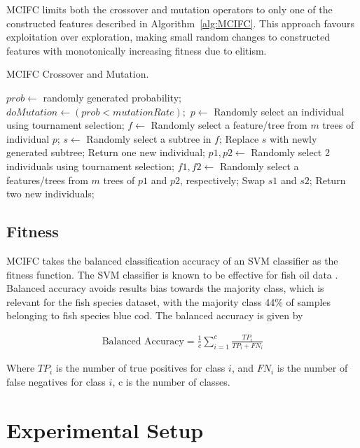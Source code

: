 \documentclass[runningheads]{llncs}
\begin{document}
MCIFC limits both the crossover and mutation operators to only one of the constructed features described in Algorithm~\ref{alg:MCIFC}. 
This approach favours exploitation over exploration, making small random changes to constructed features with monotonically increasing fitness due to elitism. 

\begin{algorithm}
\caption{MCIFC Crossover and Mutation.}
\label{alg:MCIFC}
\begin{algorithmic}
\State $prob \gets $ randomly generated probability;
\State $doMutation \gets (prob < mutationRate);$
  \State $p \gets$ Randomly select an individual using tournament selection; 
  \State $f \gets$ Randomly select a feature/tree from $m$ trees of individual $p$;
  \State $s \gets$ Randomly select a subtree in $f$; 
  \State Replace $s$ with newly generated subtree; 
  \State Return one new individual; 
\Else 
  \State $p1, p2 \gets $ Randomly select 2 individuals using tournament selection; 
  \State $f1, f2 \gets$ Randomly select a features/trees from $m$ trees of  $p1$ and $p2$, respectively;
  \State Swap $s1$ and $s2$; 
  \State Return two new individuals;
\EndIf
\end{algorithmic}
\end{algorithm}

\subsection{Fitness}

MCIFC takes the balanced classification accuracy of an SVM classifier as the fitness function. 
The SVM classifier is known to be effective for fish oil data \cite{long2022ai}.
Balanced accuracy avoids results bias towards the majority class, which is relevant for the fish species dataset, with the majority class 44\% of samples belonging to fish species blue cod. 
The balanced accuracy is given by 

\begin{align}
  \text{Balanced Accuracy} = \frac{1}{c} \sum_{i=1}^{c} \frac{TP_i}{TP_i + FN_i}
\end{align}

Where $TP_i$ is the number of true positives for class $i$, and $FN_i$ is the number of false negatives for class $i$, c is the number of classes. 

\section{Experimental Setup}
\end{document}
